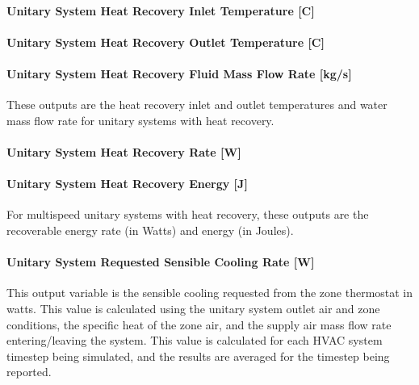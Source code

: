 \paragraph{Unitary System Heat Recovery Inlet Temperature {[}C{]}}\label{unitary-system-heat-recovery-inlet-temperature-c}

\paragraph{Unitary System Heat Recovery Outlet Temperature {[}C{]}}\label{unitary-system-heat-recovery-outlet-temperature-c}

\paragraph{Unitary System Heat Recovery Fluid Mass Flow Rate {[}kg/s{]}}\label{unitary-system-heat-recovery-fluid-mass-flow-rate-kgs}

These outputs are the heat recovery inlet and outlet temperatures and water mass flow rate for unitary systems with heat recovery.

\paragraph{Unitary System Heat Recovery Rate {[}W{]}}\label{unitary-system-heat-recovery-rate-w}

\paragraph{Unitary System Heat Recovery Energy {[}J{]}}\label{unitary-system-heat-recovery-energy-j}

For multispeed unitary systems with heat recovery, these outputs are the recoverable energy rate (in Watts) and energy (in Joules).

\paragraph{Unitary System Requested Sensible Cooling Rate {[}W{]}}\label{unitary-system-requested-sensible-cooling-rate-w}

This output variable is the sensible cooling requested from the zone thermostat in watts. This value is calculated using the unitary system outlet air and zone conditions, the specific heat of the zone air, and the supply air mass flow rate entering/leaving the system. This value is calculated for each HVAC system timestep being simulated, and the results are averaged for the timestep being reported.

